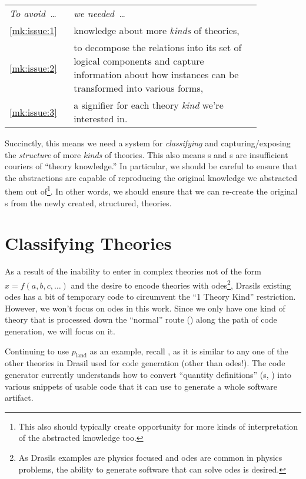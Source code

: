 \begin{longtable}[c]{>{\raggedright}p{0.2\linewidth}>{\raggedright\arraybackslash}p{0.65\linewidth}}
    \textit{To avoid~\ldots{}} & \textit{we needed~\ldots{}}                                    \\
    \ref{mk:issue:1}           & knowledge about more \textit{kinds} of theories,               \\
    \ref{mk:issue:2}           & to decompose the relations into its set of
    logical components and capture information about how instances can be
    transformed into various forms,                                                             \\
    \ref{mk:issue:3}           & a signifier for each theory \textit{kind} we're interested in. \\
\end{longtable}

Succinctly, this means we need a system for \textit{classifying} and
capturing/exposing the \textit{structure} of more \textit{kinds} of theories.
This also means \RelationConcept{}s and \Relation{}s are insufficient couriers
of ``theory knowledge.'' In particular, we should be careful to ensure that the
abstractions are capable of reproducing the original knowledge we abstracted
them out of\footnote{This also should typically create opportunity for more
kinds of interpretation of the abstracted knowledge too.}. In other words, we
should ensure that we can re-create the original \RelationConcept{}s from the
newly created, structured, theories.

\section{Classifying Theories}
\label{chap:modelkinds:sec:classifying-theories}

As a result of the inability to enter in complex theories not of the form \(x =
f(a, b, c, \ldots{})\) and the desire to encode theories with
\acsp{ode}\footnote{As Drasils examples are physics focused and \acsp{ode} are
    common in physics problems, the ability to generate software that can solve
    \acsp{ode} is desired.}, Drasils existing \acsp{ode} has a bit of temporary code
to circumvent the ``1 Theory Kind'' restriction. However, we won't focus on
\acsp{ode} in this work. Since we only have one kind of theory that is processed
down the ``normal'' route (\relToQD{}) along the path of code generation, we
will focus on it.

Continuing to use \(p_\text{land}\) as an example, recall
, as it is similar to any one of the other
theories in Drasil used for code generation (other than \acsp{ode}!). The code
generator currently understands how to convert ``quantity definitions''
(\QDefinition{}s, ) into various snippets of
usable code that it can use to generate a whole software artifact.

